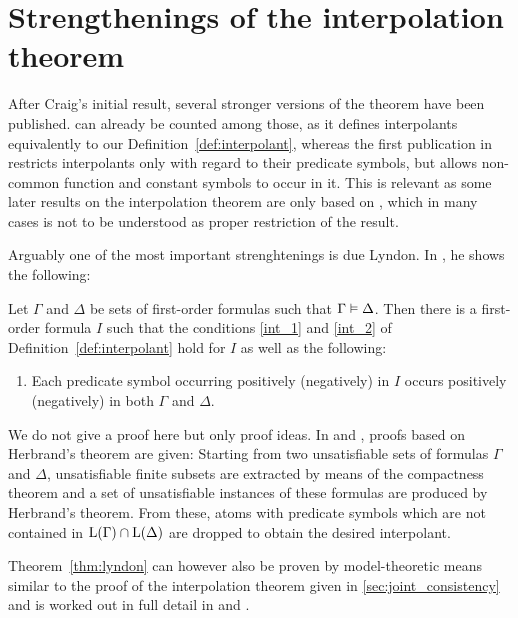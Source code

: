 \section{Strengthenings of the interpolation theorem}
\label{sec:strenghtenings}

After Craig's initial result, several stronger versions of the theorem have been published.
\cite{Craig57three} can already be counted among those,
as it defines interpolants equivalently to our Definition~\ref{def:interpolant}, 
whereas the first publication in \cite{Craig57linear} restricts interpolants only with regard to their predicate symbols, but allows non-common function and constant symbols to occur in it.
This is relevant as some later results on the interpolation theorem are only based on \cite{Craig57linear}, which in many cases is not to be understood as proper restriction of the result.


Arguably one of the most important strenghtenings is due Lyndon. In \cite{lyndon59}, he shows the following:

\begin{thm}[Lyndon]
	\label{thm:lyndon}
Let $\Gamma$ and $\Delta$ be sets of first-order formulas such that $\Gamma \entails\nolinebreak \Delta$. 
Then there is a first-order formula $I$ such that the conditions \ref{int_1} and \ref{int_2} of Definition~\ref{def:interpolant} hold for $I$ as well as the following:
\begin{enumerate}
		\renewcommand{\theenumi}{\arabic{enumi}'}
		\setcounter{enumi}{2}
	\item Each predicate symbol occurring positively (negatively) in $I$ occurs positively (negatively) in both $\Gamma$ and $\Delta$.
		\label{int_lyndon_3}
\end{enumerate}
\end{thm}

We do not give a proof here but only proof ideas.
In \cite{lyndon59} and \cite{slagle70}, proofs based on Herbrand's theorem are given:
Starting from two unsatisfiable sets of formulas $\Gamma$ and $\Delta$, unsatisfiable finite subsets are extracted by means of the compactness theorem and a set of unsatisfiable instances of these formulas are produced by Herbrand's theorem.
From these, atoms with predicate symbols which are not contained in $\operatorname{L}(\Gamma) \cap \operatorname{L}(\Delta)$ are dropped to obtain the desired interpolant.

Theorem~\ref{thm:lyndon} can however also be proven by model-theoretic means similar to the proof of the interpolation theorem given in \ref{sec:joint_consistency}
and is worked out in full detail in \cite{Henkin63} and \cite[Theorem\ 2.2.24]{chang1990model}.

